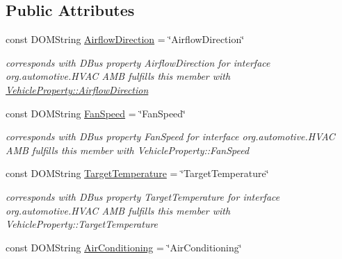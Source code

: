 \subsection*{Public Attributes}
\begin{DoxyCompactItemize}
\item 
\hypertarget{interfaceHVAC_a9c9da298987d1f7947e78bb494a5393a}{const D\+O\+M\+String \hyperlink{interfaceHVAC_a9c9da298987d1f7947e78bb494a5393a}{Airflow\+Direction} = \char`\"{}Airflow\+Direction\char`\"{}}\label{interfaceHVAC_a9c9da298987d1f7947e78bb494a5393a}

\begin{DoxyCompactList}\small\item\em corresponds with D\+Bus property Airflow\+Direction for interface org.\+automotive.\+H\+V\+A\+C A\+M\+B fulfills this member with \hyperlink{classVehicleProperty_adeeec47dbbcc60ee78b30c8c1a917836}{Vehicle\+Property\+::\+Airflow\+Direction} \end{DoxyCompactList}\item 
\hypertarget{interfaceHVAC_a58d0a4238baeec3d60616dce4f740a5d}{const D\+O\+M\+String \hyperlink{interfaceHVAC_a58d0a4238baeec3d60616dce4f740a5d}{Fan\+Speed} = \char`\"{}Fan\+Speed\char`\"{}}\label{interfaceHVAC_a58d0a4238baeec3d60616dce4f740a5d}

\begin{DoxyCompactList}\small\item\em corresponds with D\+Bus property Fan\+Speed for interface org.\+automotive.\+H\+V\+A\+C A\+M\+B fulfills this member with Vehicle\+Property\+::\+Fan\+Speed \end{DoxyCompactList}\item 
\hypertarget{interfaceHVAC_a822cb43250a25fecaca0721ac316ff6c}{const D\+O\+M\+String \hyperlink{interfaceHVAC_a822cb43250a25fecaca0721ac316ff6c}{Target\+Temperature} = \char`\"{}Target\+Temperature\char`\"{}}\label{interfaceHVAC_a822cb43250a25fecaca0721ac316ff6c}

\begin{DoxyCompactList}\small\item\em corresponds with D\+Bus property Target\+Temperature for interface org.\+automotive.\+H\+V\+A\+C A\+M\+B fulfills this member with Vehicle\+Property\+::\+Target\+Temperature \end{DoxyCompactList}\item 
\hypertarget{interfaceHVAC_afda1098bcd46867aff6f8d01ccad7927}{const D\+O\+M\+String \hyperlink{interfaceHVAC_afda1098bcd46867aff6f8d01ccad7927}{Air\+Conditioning} = \char`\"{}Air\+Conditioning\char`\"{}}\label{interfaceHVAC_afda1098bcd46867aff6f8d01ccad7927}


\end{DoxyCompactItemize}
